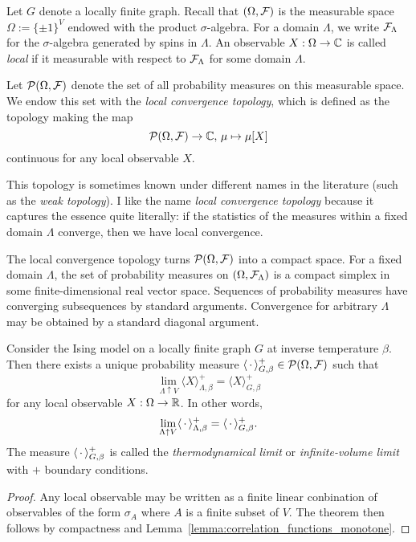 \begin{definition}
    Let $G$ denote a locally finite graph.
    Recall that $(\Omega,\mathcal F)$ is the measurable space $\Omega:=\{\pm1\}^V$
    endowed with the product $\sigma$-algebra.
    For a domain $\Lambda$, we write $\mathcal F_\Lambda$
    for the $\sigma$-algebra generated by spins in $\Lambda$.
    An observable $X:\Omega\to\mathbb C$ is called \emph{local} if it measurable
    with respect to $\mathcal F_\Lambda$ for some domain $\Lambda$.

    Let $\mathcal P(\Omega,\mathcal F)$ denote the set of all probability measures
    on this measurable space.
    We endow this set with the \emph{local convergence topology},
    which is defined as the topology making the map
    \[
        \mathcal P(\Omega,\mathcal F)\to\mathbb C,\,\mu\mapsto\mu[X]
    \]
    continuous for any local observable $X$.
\end{definition}

\begin{remark}
    This topology is sometimes known under different names in the literature
    (such as the \emph{weak topology}).
    I like the name \emph{local convergence topology} because it captures the essence quite literally:
    if the statistics of the measures within a fixed domain $\Lambda$ converge,
    then we have local convergence.
\end{remark}

\begin{remark}
    The local convergence topology turns $\mathcal P(\Omega,\mathcal F)$ into a compact space.
    For a fixed domain $\Lambda$, the set of probability measures
    on $(\Omega,\mathcal F_\Lambda)$ is a compact simplex in some finite-dimensional
    real vector space.
    Sequences of probability measures have converging subsequences by standard
    arguments.
    Convergence for arbitrary $\Lambda$ may be obtained by a standard diagonal
    argument.
\end{remark}

\begin{theorem}
    Consider the Ising model on a locally finite graph $G$
    at inverse temperature $\beta$.
    Then there exists a unique probability measure
    $\langle\,\cdot\,\rangle_{G,\beta}^+\in\mathcal P(\Omega,\mathcal F)$
    such that
    \[
        \lim_{\Lambda\uparrow V}\langle X\rangle_{\Lambda,\beta}^+=\langle X\rangle_{G,\beta}^+
    \]
    for any local observable $X:\Omega\to\mathbb R$.
    In other words,
    \[
        \lim_{\Lambda\uparrow V}\langle \,\cdot\,\rangle_{\Lambda,\beta}^+
        =
        \langle \,\cdot\,\rangle_{G,\beta}^+.
    \]
    The measure $\langle\,\cdot\,\rangle_{G,\beta}^+$ is called
    the \emph{thermodynamical limit} or \emph{infinite-volume limit}
    with $+$ boundary conditions.
\end{theorem}

\begin{proof}
    Any local observable may be written as a finite linear conbination
    of observables of the form $\sigma_A$ where $A$ is a finite subset of
    $V$.
    The theorem then follows by compactness and Lemma~\ref{lemma:correlation_functions_monotone}.
\end{proof}



